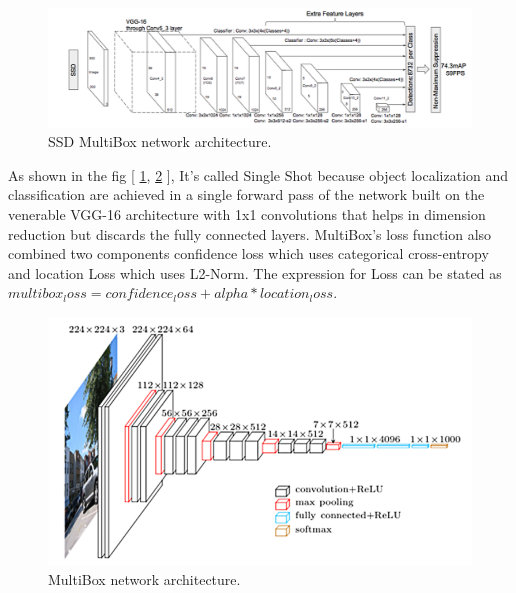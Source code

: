 \documentclass[runningheads]{llncs}
\begin{document}
\begin{figure}
\centering
\includegraphics[width=1\textwidth]{figures/multibox.png}
\caption{SSD MultiBox network architecture. } \label{ssd_multi_box}
\end{figure}

As shown in the fig [ \ref{ssd_multi_box}, \ref{multi_box_arch2} ], It’s called Single Shot because object localization and classification are achieved in a single forward pass of the network built on the venerable VGG-16 architecture with 1x1 convolutions that helps in dimension reduction but discards the fully connected layers. MultiBox’s loss function also combined two components confidence loss which uses categorical cross-entropy and location Loss which uses L2-Norm. The expression for Loss can be stated as $ multibox_loss = confidence_loss + alpha * location_loss $.\\

\begin{figure}
\centering
\includegraphics[width=1\textwidth]{figures/multi_box_arch2.png}
\caption{MultiBox network architecture.}
\label{multi_box_arch2}
\end{figure}
\end{document}
